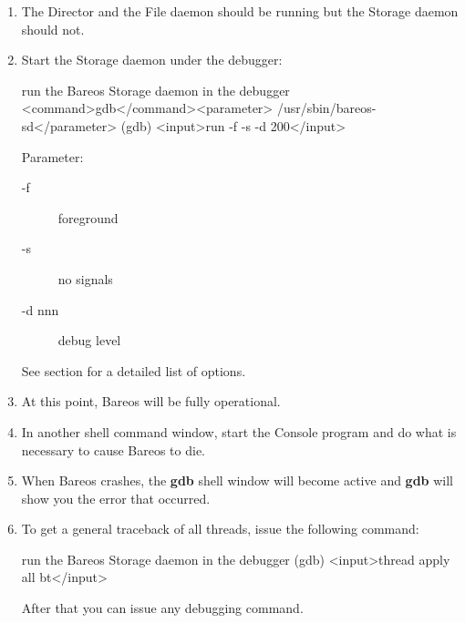 \begin{enumerate}
\item The Director and the File daemon should  be running but
   the Storage daemon should not.

\item Start the Storage daemon under the debugger:

\begin{commands}{run the Bareos Storage daemon in the debugger}
<command>gdb</command><parameter> /usr/sbin/bareos-sd</parameter>
(gdb) <input>run -f -s -d 200</input>
\end{commands}

Parameter:
\begin{description}
 \item[-f] foreground
 \item[-s] no signals
 \item[-d nnn] debug level 
\end{description}
See section  for a detailed list of options.

\item At this point, Bareos will be fully operational.

\item In another shell command window, start the Console program  and do what
   is necessary to cause Bareos to die.

\item When Bareos crashes, the {\bf gdb} shell window will  become active and
   {\bf gdb} will show you the error that  occurred.

\item To get a general traceback of all threads, issue the following  command:

\begin{commands}{run the Bareos Storage daemon in the debugger}
(gdb) <input>thread apply all bt</input>
\end{commands}

After that you can issue any debugging command.
\end{enumerate}
